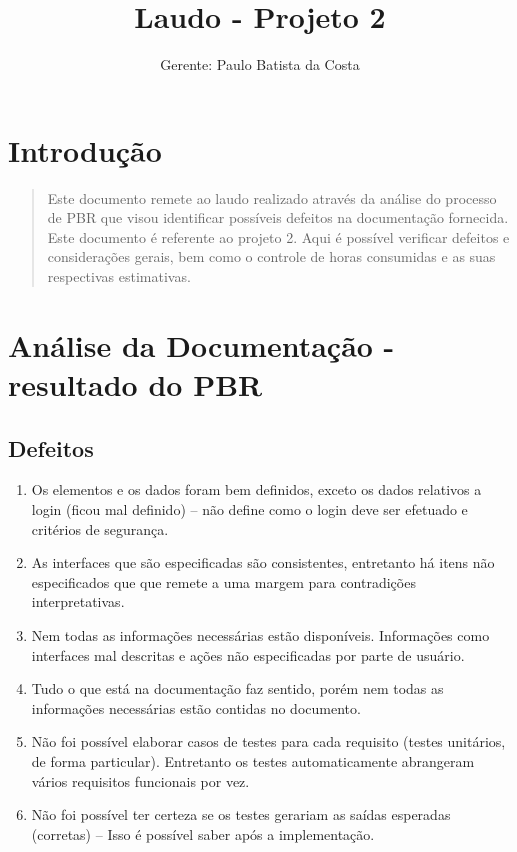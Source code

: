 \documentclass[12pt,a4paper,final]{report}
\author{Gerente: Paulo Batista da Costa}
\title{Laudo - Projeto 2}
\begin{document}
\maketitle
\section*{Introdução}
\begin{quotation}
	Este documento remete ao laudo realizado através da análise do processo de PBR que visou identificar possíveis defeitos na documentação fornecida. Este documento é referente ao projeto 2. Aqui é possível verificar defeitos e considerações gerais, bem como o controle de horas consumidas e as suas respectivas estimativas.
\end{quotation}
\section*{Análise da Documentação - resultado do PBR}
\subsection*{Defeitos}
\begin{enumerate}
	\item Os elementos e os dados foram bem definidos, exceto os dados relativos a login (ficou mal definido) -- não define como o login deve ser efetuado e critérios de segurança.
	\item As interfaces que são especificadas são consistentes, entretanto há itens não especificados que que remete a uma margem para contradições interpretativas.
	\item Nem todas as informações necessárias estão disponíveis. Informações como interfaces mal descritas e ações não especificadas por parte de usuário.
	\item Tudo o que está na documentação faz sentido, porém nem todas as informações necessárias estão contidas no documento.
	\item Não foi possível elaborar casos de testes para cada requisito (testes unitários, de forma particular). Entretanto os testes automaticamente abrangeram vários requisitos funcionais por vez.
	\item Não foi possível ter certeza se os testes gerariam as saídas esperadas (corretas) -- Isso é possível saber após a implementação.
\end{enumerate}
\end{document}
